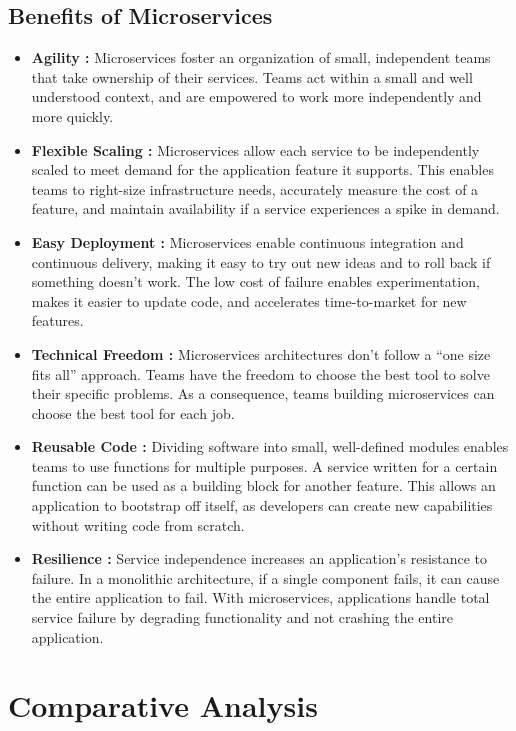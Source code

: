 \subsection{Benefits of Microservices}
\begin{itemize}
	\item \textbf{Agility :} Microservices foster an organization of small, independent teams that take ownership of their services. Teams act within a small and well understood context, and are empowered to work more independently and more quickly.
	\item \textbf{Flexible Scaling :} Microservices allow each service to be independently scaled to meet demand for the application feature it supports. This enables teams to right-size infrastructure needs, accurately measure the cost of a feature, and maintain availability if a service experiences a spike in demand.
	\item \textbf{Easy Deployment :} Microservices enable continuous integration and continuous delivery, making it easy to try out new ideas and to roll back if something doesn’t work. The low cost of failure enables experimentation, makes it easier to update code, and accelerates time-to-market for new features.
	\item \textbf{Technical Freedom :} Microservices architectures don’t follow a “one size fits all” approach. Teams have the freedom to choose the best tool to solve their specific problems. As a consequence, teams building microservices can choose the best tool for each job.
	\item \textbf{Reusable Code :} Dividing software into small, well-defined modules enables teams to use functions for multiple purposes. A service written for a certain function can be used as a building block for another feature. This allows an application to bootstrap off itself, as developers can create new capabilities without writing code from scratch.
	\item \textbf{Resilience :} Service independence increases an application’s resistance to failure. In a monolithic architecture, if a single component fails, it can cause the entire application to fail. With microservices, applications handle total service failure by degrading functionality and not crashing the entire application.
\end{itemize}

\section{Comparative Analysis}

